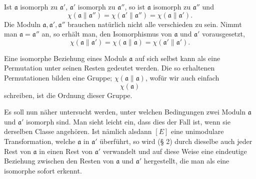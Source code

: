 Ist $\mathfrak a$ isomorph zu $\mathfrak a'$, $\mathfrak a'$ isomorph zu $\mathfrak a''$, so ist $\mathfrak a$ isomorph zu $\mathfrak a''$ und
\[
 \chi(\mathfrak a\parallel\mathfrak a'')=
 \chi(\mathfrak a'\parallel\mathfrak a'')=
 \chi(\mathfrak a\parallel\mathfrak a').
\]
Die Moduln $\mathfrak a,\mathfrak a',\mathfrak a''$ brauchen natürlich nicht alle verschieden zu sein. Nimmt man $\mathfrak a=\mathfrak a''$ an, so erhält man, den Isomorphismus von $\mathfrak a$ und $\mathfrak a'$ vorausgesetzt,
\[
 \chi(\mathfrak a\parallel\mathfrak a')=
 \chi(\mathfrak a\parallel\mathfrak a)=
 \chi(\mathfrak a'\parallel\mathfrak a').
\]

Eine isomorphe Beziehung eines Moduls $\mathfrak a$ auf sich selbst kann als eine Permutation unter seinen Resten gedeutet werden. Die so erhaltenen Permutationen bilden eine Gruppe; $\chi(\mathfrak a\parallel\mathfrak a)$, wofür wir auch einfach
\[
 \chi(\mathfrak a)
\]
schreiben, ist die Ordnung dieser Gruppe.

Es soll nun näher untersucht werden, unter welchen Bedingungen zwei Moduln $\mathfrak a$ und $\mathfrak a'$ isomorph sind. Man sieht leicht ein, dass dies der Fall ist, wenn sie derselben Classe angehören. Ist nämlich alsdann $[E]$ eine unimodulare Transformation, welche $\mathfrak a$ in $\mathfrak a'$ überführt, so wird (§ 2) durch dieselbe auch jeder Rest von $\mathfrak a$ in einen Rest von $\mathfrak a'$ verwandelt und auf diese Weise eine eindeutige Beziehung zwischen den Resten von $\mathfrak a$ und $\mathfrak a'$ hergestellt, die man als eine isomorphe sofort erkennt.

